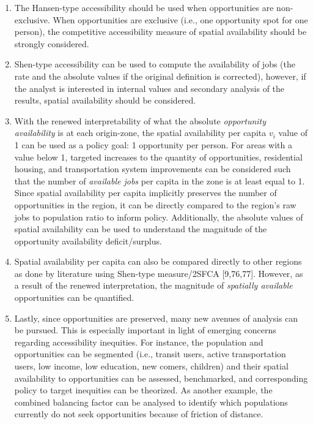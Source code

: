 \documentclass[10pt,letterpaper]{article}
\begin{document}
\begin{enumerate}
\def\labelenumi{\arabic{enumi})}
\item
  The Hansen-type accessibility should be used when opportunities are
  non-exclusive. When opportunities are exclusive (i.e., one opportunity
  spot for one person), the competitive accessibility measure of spatial
  availability should be strongly considered.
\item
  Shen-type accessibility can be used to compute the availability of
  jobs (the rate and the absolute values if the original definition is
  corrected), however, if the analyst is interested in internal values
  and secondary analysis of the results, spatial availability should be
  considered.
\item
  With the renewed interpretability of what the absolute
  \emph{opportunity availability} is at each origin-zone, the spatial
  availability per capita \(v_i\) value of 1 can be used as a policy
  goal: 1 opportunity per person. For areas with a value below 1,
  targeted increases to the quantity of opportunities, residential
  housing, and transportation system improvements can be considered such
  that the number of \emph{available jobs} per capita in the zone is at
  least equal to 1. Since spatial availability per capita implicitly
  preserves the number of opportunities in the region, it can be
  directly compared to the region's raw jobs to population ratio to
  inform policy. Additionally, the absolute values of spatial
  availability can be used to understand the magnitude of the
  opportunity availability deficit/surplus.
\item
  Spatial availability per capita can also be compared directly to other
  regions as done by literature using Shen-type measure/2SFCA
  {[}9,76,77{]}. However, as a result of the renewed interpretation, the
  magnitude of \emph{spatially available} opportunities can be
  quantified.
\item
  Lastly, since opportunities are preserved, many new avenues of
  analysis can be pursued. This is especially important in light of
  emerging concerns regarding accessibility inequities. For instance,
  the population and opportunities can be segmented (i.e., transit
  users, active transportation users, low income, low education, new
  comers, children) and their spatial availability to opportunities can
  be assessed, benchmarked, and corresponding policy to target
  inequities can be theorized. As another example, the combined
  balancing factor can be analysed to identify which populations
  currently do not seek opportunities because of friction of distance.
\end{enumerate}
\end{document}
